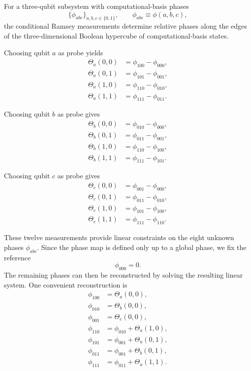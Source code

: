 \medskip
\noindent
For a three-qubit subsystem with computational-basis phases
\[
\{\phi_{abc}\}_{a,b,c\in\{0,1\}},
\qquad
\phi_{abc}\equiv \phi(a,b,c),
\]
the conditional Ramsey measurements determine relative phases along the edges of the three-dimensional Boolean hypercube of computational-basis states.

\medskip
\noindent
Choosing qubit $a$ as probe yields
\begin{align}
\Theta_a(0,0) &= \phi_{100}-\phi_{000}, \\
\Theta_a(0,1) &= \phi_{101}-\phi_{001}, \\
\Theta_a(1,0) &= \phi_{110}-\phi_{010}, \\
\Theta_a(1,1) &= \phi_{111}-\phi_{011}.
\end{align}

\noindent
Choosing qubit $b$ as probe gives
\begin{align}
\Theta_b(0,0) &= \phi_{010}-\phi_{000}, \\
\Theta_b(0,1) &= \phi_{011}-\phi_{001}, \\
\Theta_b(1,0) &= \phi_{110}-\phi_{100}, \\
\Theta_b(1,1) &= \phi_{111}-\phi_{101}.
\end{align}

\noindent
Choosing qubit $c$ as probe gives
\begin{align}
\Theta_c(0,0) &= \phi_{001}-\phi_{000}, \\
\Theta_c(0,1) &= \phi_{011}-\phi_{010}, \\
\Theta_c(1,0) &= \phi_{101}-\phi_{100}, \\
\Theta_c(1,1) &= \phi_{111}-\phi_{110}.
\end{align}

\medskip
\noindent
These twelve measurements provide linear constraints on the eight unknown phases $\phi_{abc}$. Since the phase map is defined only up to a global phase, we fix the reference
\[
\phi_{000}=0.
\]
The remaining phases can then be reconstructed by solving the resulting linear system. One convenient reconstruction is
\begin{align}
\phi_{100} &= \Theta_a(0,0), \\
\phi_{010} &= \Theta_b(0,0), \\
\phi_{001} &= \Theta_c(0,0), \\
\phi_{110} &= \phi_{010}+\Theta_a(1,0), \\
\phi_{101} &= \phi_{001}+\Theta_a(0,1), \\
\phi_{011} &= \phi_{001}+\Theta_b(0,1), \\
\phi_{111} &= \phi_{011}+\Theta_a(1,1).
\end{align}

